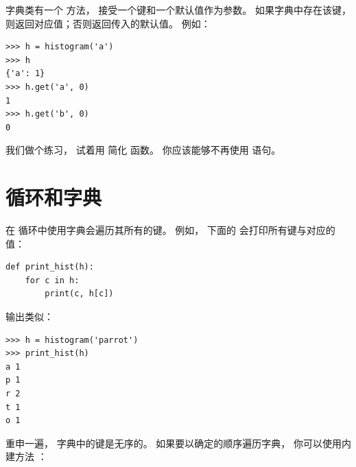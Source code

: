 字典类有一个  方法， 接受一个键和一个默认值作为参数。
如果字典中存在该键， 则返回对应值；否则返回传入的默认值。   例如：

\begin{lstlisting}
>>> h = histogram('a')
>>> h
{'a': 1}
>>> h.get('a', 0)
1
>>> h.get('b', 0)
0
\end{lstlisting}

%

我们做个练习， 试着用  简化  函数。  你应该能够不再使用  语句。


\section{循环和字典}

  


在  循环中使用字典会遍历其所有的键。
例如， 下面的  会打印所有键与对应的值：

\begin{lstlisting}
def print_hist(h):
    for c in h:
        print(c, h[c])
\end{lstlisting}

%

输出类似：

\begin{lstlisting}
>>> h = histogram('parrot')
>>> print_hist(h)
a 1
p 1
r 2
t 1
o 1
\end{lstlisting}

%

重申一遍， 字典中的键是无序的。
如果要以确定的顺序遍历字典， 你可以使用内建方法 ：

  

